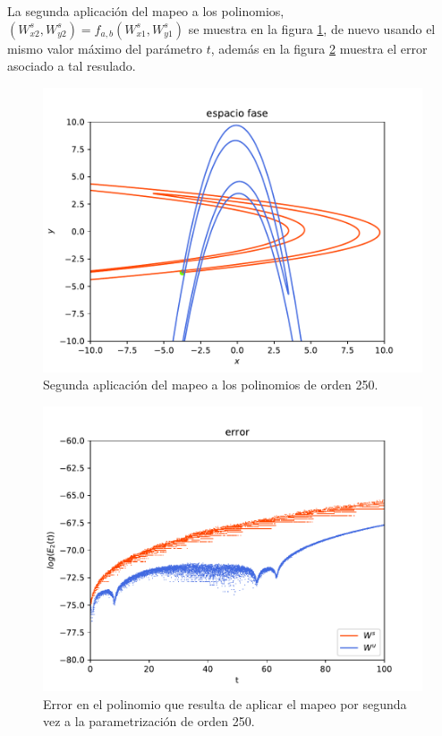 La segunda aplicación del mapeo a los polinomios, $(W_{x2}^{s},W_{y2}^{s})=f_{a,b}(W_{x1}^{s},W_{y1}^{s})$ se muestra en la figura \ref{Rectangulo2}, de nuevo usando el mismo valor máximo del parámetro $t$, además en la figura \ref{error-2iteracion} muestra el error asociado a tal resulado.
\begin{figure}[H]
\centering
\includegraphics[scale=0.7]{rectangulo2.pdf}
\caption{Segunda aplicación del mapeo a los polinomios de orden 250.}
\label{Rectangulo2}
\end{figure}

\begin{figure}[H]
\centering
\includegraphics[scale=0.7]{error2ite.pdf}
\caption{Error en el polinomio que resulta de aplicar el mapeo por segunda vez a la parametrización de orden 250.}
\label{error-2iteracion}
\end{figure}


